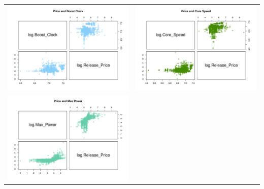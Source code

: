 \documentclass[a4paper]{article}
\begin{document}
\begin{center}
\begin{adjustbox}{width=\textwidth}
    \begin{tabular}{cc}
        \includegraphics[keepaspectratio, width=1\textwidth, height=1\textheight]{Visualization/Pairs/price_boostclock.pdf}
        &\includegraphics[keepaspectratio, width=1\textwidth, height=1\textheight]{Visualization/Pairs/price_corespeed.pdf}\\
        \includegraphics[keepaspectratio, width=1\textwidth, height=1\textheight]{Visualization/Pairs/price_maxpower.pdf}

\end{tabular}
\end{adjustbox}
\end{center}
\end{document}
